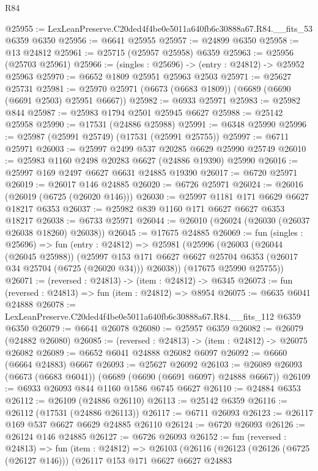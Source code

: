 \begin{lexlean}{R84}
\begin{coremodule}
@25955 := LexLeanPreserve.C20ded4f4be0e5011a640fb6c30888a67.R84.__fits_53 @6359 @6350
@25956 := @6641 @25955
@25957 := @24899 @6350
@25958 := @13 @24812
@25961 := @25715 (@25957 @25958) @6359
@25963 := @25956 (@25703 @25961)
@25966 := (singles : @25696) -> (entry : @24812) -> @25952 @25963
@25970 := @6652 @1809 @25951 @25963 @2503
@25971 := @25627 @25731
@25981 := @25970 @25971 (@6673 (@6683 @1809)) (@6689 (@6690 (@6691 @2503) @25951 @6667))
@25982 := @6933 @25971
@25983 := @25982 @844
@25987 := @25983 @1794 @2501 @25945 @6627
@25988 := @25142 @25958
@25990 := @17531 (@24886 @25988)
@25991 := @6348 @25990
@25996 := @25987 (@25991 @25749) (@17531 (@25991 @25755))
@25997 := @6711 @25971
@26003 := @25997 @2499 @537 @20285 @6629 @25990 @25749
@26010 := @25983 @1160 @2498 @20283 @6627 (@24886 @19390) @25990
@26016 := @25997 @169 @2497 @6627 @6631 @24885 @19390
@26017 := @6720 @25971
@26019 := @26017 @146 @24885
@26020 := @6726 @25971
@26024 := @26016 (@26019 (@6725 (@26020 @146)))
@26030 := @25997 @1181 @171 @6629 @6627 @18217 @6353
@26037 := @25982 @839 @1160 @171 @6627 @6627 @6353 @18217
@26038 := @6733 @25971
@26044 := @26010 (@26024 (@26030 (@26037 @26038 @18260) @26038))
@26045 := @17675 @24885
@26069 := fun (singles : @25696) =>
  fun (entry : @24812) =>
  @25981
    (@25996
      (@26003
        (@26044 (@26045 @25988))
        (@25997 @153 @171 @6627 @6627 @25704 @6353 (@26017 @34 @25704 (@6725 (@26020 @34))) @26038))
      (@17675 @25990 @25755))
@26071 := (reversed : @24813) -> (item : @24812) -> @6345
@26073 := fun (reversed : @24813) => fun (item : @24812) => @8954
@26075 := @6635 @6041 @24888
@26078 := LexLeanPreserve.C20ded4f4be0e5011a640fb6c30888a67.R84.__fits_112 @6359 @6350
@26079 := @6641 @26078
@26080 := @25957 @6359
@26082 := @26079 (@24882 @26080)
@26085 := (reversed : @24813) -> (item : @24812) -> @26075 @26082
@26089 := @6652 @6041 @24888 @26082 @6097
@26092 := @6660 (@6664 @24883) @6667
@26093 := @25627 @26092
@26103 := @26089 @26093 (@6673 (@6683 @6041)) (@6689 (@6690 (@6691 @6097) @24888 @6667))
@26109 := @6933 @26093 @844 @1160 @1586 @6745 @6627
@26110 := @24884 @6353
@26112 := @26109 (@24886 @26110)
@26113 := @25142 @6359
@26116 := @26112 (@17531 (@24886 @26113))
@26117 := @6711 @26093
@26123 := @26117 @169 @537 @6627 @6629 @24885 @26110
@26124 := @6720 @26093
@26126 := @26124 @146 @24885
@26127 := @6726 @26093
@26152 := fun (reversed : @24813) =>
  fun (item : @24812) =>
  @26103
    (@26116
      (@26123
        (@26126 (@6725 (@26127 @146)))
        (@26117
          @153
          @171
          @6627
          @6627
          @24883

\end{coremodule}
\end{lexlean}
